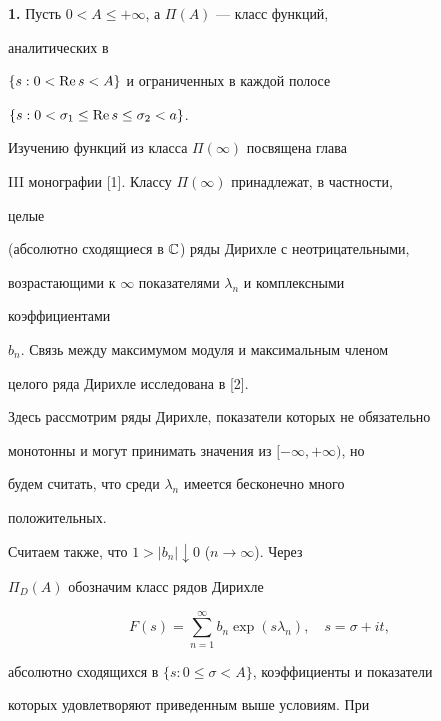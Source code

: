   


\maketitle  


 


 


{\bf 1.} Пусть $0<A\le+\infty$, а $\Pi(A)$ --- класс функций, 


аналитических в 


$\{s:0<\operatorname{Re} s<A\}$ и ограниченных в каждой полосе 


$\{s:0<\sigma_1\le\operatorname{Re} s\le \sigma_2<a\}$. 


Изучению функций из класса $\Pi(\infty)$ посвящена глава 


{III} монографии [1]. Классу $\Pi(\infty)$ принадлежат, в частности, 


целые 


(абсолютно сходящиеся в $\Bbb C$) ряды Дирихле с неотрицательными, 


возрастающими к $\infty$ показателями $\lambda_n$ и комплексными 


коэффициентами 


$b_n$. Связь между максимумом модуля и максимальным членом 


целого ряда Дирихле исследована в [2]. 


 


Здесь рассмотрим ряды Дирихле, показатели которых не обязательно 


монотонны и могут принимать значения из $[-\infty,+\infty)$, но 


будем считать, что среди $\lambda_n$ имеется бесконечно много 


положительных. 


Считаем также, что $1>|b_n|\downarrow 0$ ($n\to\infty$). Через 


$\Pi_D(A)$ обозначим класс рядов Дирихле 


\begin{equation} 


F(s)=\sum^\infty_{n=1}b_n\exp(s\lambda_n),\quad 


s=\sigma+it, 


\end{equation} 


абсолютно сходящихся в $\{s:0\le\sigma<A\}$, коэффициенты и показатели 


которых удовлетворяют приведенным выше условиям. При 


